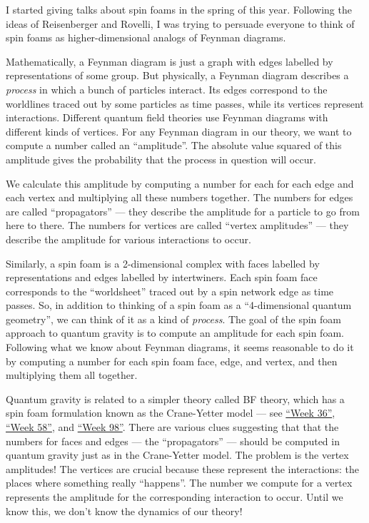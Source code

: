 \documentclass{article}
\def\tightlist{}
\renewcommand{\texttt}[1]{%
  \begingroup
  \ttfamily
  \begingroup\lccode`~=`/\lowercase{\endgroup\def~}{/\discretionary{}{}{}}%
  \begingroup\lccode`~=`[\lowercase{\endgroup\def~}{[\discretionary{}{}{}}%
  \begingroup\lccode`~=`.\lowercase{\endgroup\def~}{.\discretionary{}{}{}}%
  \catcode`/=\active\catcode`[=\active\catcode`.=\active
  \scantokens{#1\noexpand}%
  \endgroup
}
\begin{document}

I started giving talks about spin foams in the spring of this year.
Following the ideas of Reisenberger and Rovelli, I was trying to
persuade everyone to think of spin foams as higher-dimensional analogs
of Feynman diagrams.

Mathematically, a Feynman diagram is just a graph with edges labelled by
representations of some group. But physically, a Feynman diagram
describes a \emph{process} in which a bunch of particles interact. Its
edges correspond to the worldlines traced out by some particles as time
passes, while its vertices represent interactions. Different quantum
field theories use Feynman diagrams with different kinds of vertices.
For any Feynman diagram in our theory, we want to compute a number
called an ``amplitude''. The absolute value squared of this amplitude
gives the probability that the process in question will occur.

We calculate this amplitude by computing a number for each for each edge
and each vertex and multiplying all these numbers together. The numbers
for edges are called ``propagators'' --- they describe the amplitude for
a particle to go from here to there. The numbers for vertices are called
``vertex amplitudes'' --- they describe the amplitude for various
interactions to occur.

Similarly, a spin foam is a 2-dimensional complex with faces labelled by
representations and edges labelled by intertwiners. Each spin foam face
corresponds to the ``worldsheet'' traced out by a spin network edge as
time passes. So, in addition to thinking of a spin foam as a
``4-dimensional quantum geometry'', we can think of it as a kind of
\emph{process}. The goal of the spin foam approach to quantum gravity is
to compute an amplitude for each spin foam. Following what we know about
Feynman diagrams, it seems reasonable to do it by computing a number for
each spin foam face, edge, and vertex, and then multiplying them all
together.

Quantum gravity is related to a simpler theory called BF theory, which
has a spin foam formulation known as the Crane-Yetter model --- see
\protect\hyperlink{week36}{``Week 36''},
\protect\hyperlink{week58}{``Week 58''}, and
\protect\hyperlink{week98}{``Week 98''}. There are various clues
suggesting that that the numbers for faces and edges --- the
``propagators'' --- should be computed in quantum gravity just as in the
Crane-Yetter model. The problem is the vertex amplitudes! The vertices
are crucial because these represent the interactions: the places where
something really ``happens''. The number we compute for a vertex
represents the amplitude for the corresponding interaction to occur.
Until we know this, we don't know the dynamics of our theory!
\end{document}
